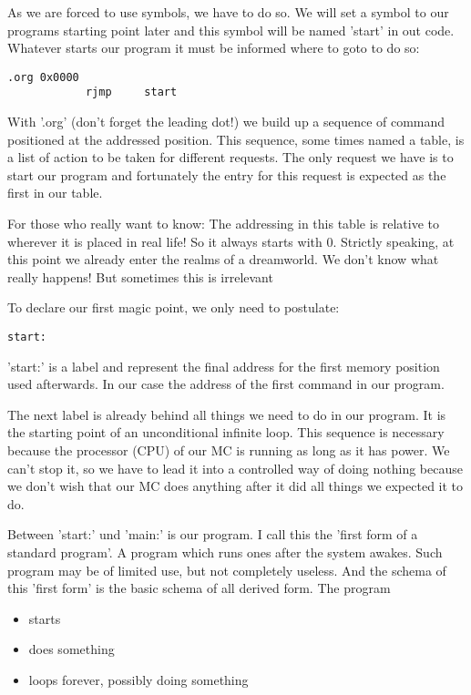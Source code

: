 As we are forced to use symbols, we have to do so. We will set a symbol to our programs starting point later and this symbol will be named 'start' in out code. Whatever starts our program it must be informed where to goto to do so:

\begin{lstlisting}
.org 0x0000
            rjmp     start 
\end{lstlisting}

With '.org' (don't forget the leading dot!) we build up a sequence of command positioned at the addressed position. This sequence, some times named a table, is a list of action to be taken for different requests. The only request we have is to start our program and fortunately the entry for this request is expected as the first in our table.

For those who really want to know: The addressing in this table is relative to wherever it is placed in real life! So it always starts with 0. Strictly speaking, at this point we already enter the realms of a dreamworld. We don't know what really happens! But sometimes this is irrelevant

To declare our first magic point, we only need to postulate:

\begin{lstlisting}
start:
\end{lstlisting}

'start:'  is a label and represent the final address for the first memory position used afterwards. In our case the address of the first command in our program.

The next label is already behind all things we need to do in our program. It is the starting point of an unconditional infinite loop. This sequence is necessary because the processor (CPU) of our MC is running as long as it has power. We can't stop it, so we have to lead it into a controlled way of doing nothing because we don't wish that our MC does anything after it did all things we expected it to do.

Between 'start:' und 'main:' is our program. I call this the 'first form of a standard program'. A program which runs ones after the system awakes. Such program may be of limited use, but not completely useless. And the schema of this 'first form' is the basic schema of all derived form. The program 

\begin{itemize}
  \item  starts
  \item  does something
  \item  loops forever, possibly doing something
\end{itemize}

